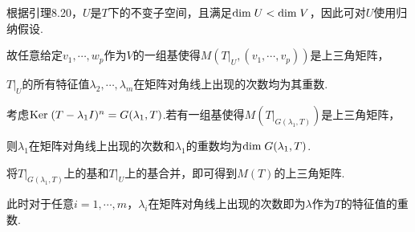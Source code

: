 根据引理8.20，\(U\)是\(T\)下的不变子空间，且满足\(\mathrm{dim \;} U<\mathrm{dim \;} V\)，因此可对\(U\)使用归纳假设.

故任意给定\(v_1,\cdots,w_p\)作为\(V\)的一组基使得\(M(T|_U,(v_1,\cdots,v_p))\)是上三角矩阵，

\(T|_U\)的所有特征值\(\lambda_2,\cdots,\lambda_m\)在矩阵对角线上出现的次数均为其重数.

考虑\(\mathrm{Ker \;} (T-\lambda_1 I)^n=G(\lambda_1,T)\).若有一组基使得\(M(T|_{G(\lambda_1,T)})\)是上三角矩阵，

则\(\lambda_1\)在矩阵对角线上出现的次数和\(\lambda_1\)的重数均为\(\mathrm{dim \;} G(\lambda_1,T)\).

将\(T|_{G(\lambda_1,T)}\)上的基和\(T|_U\)上的基合并，即可得到\(M(T)\)的上三角矩阵.

此时对于任意\(i=1,\cdots,m\)，\(\lambda_i\)在矩阵对角线上出现的次数即为\(\lambda\)作为\(T\)的特征值的重数.

